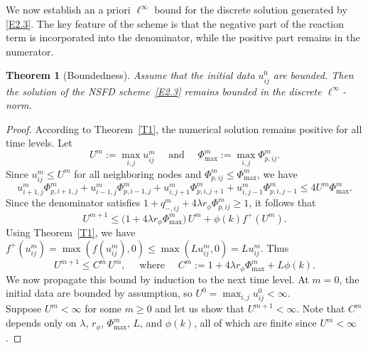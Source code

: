 \documentclass[final,12pt,3p]{elsarticle}
\theoremstyle{plain}
\newtheorem{theorem}{Theorem}
\theoremstyle{definition}
\theoremstyle{remark}
\begin{document}
We now establish an a priori $\ell^\infty$ bound for the discrete solution generated by \eqref{E2.3}. 
The key feature of the scheme is that the negative part of the reaction term is incorporated into the denominator, while the positive part remains in the numerator. 

\begin{theorem}[Boundedness]\label{T3}
Assume that the initial data $u_{ij}^0$ are bounded. 
Then the solution of the NSFD scheme~\eqref{E2.3} remains bounded in the discrete $\ell^\infty$-norm.
\end{theorem}
\begin{proof}
According to Theorem~\ref{T1}, the numerical solution remains positive for all time levels. 
Let
\begin{equation*}
U^m := \max_{i,j} u_{ij}^m \quad \text{ and } \quad \Phi_{\max}^m := \max_{i,j} \Phi_{p,ij}^m.
\end{equation*}
Since $u_{ij}^m \le U^m$ for all neighboring nodes and $\Phi_{p,ij}^m \le \Phi_{\max}^m$, we have
\begin{equation*}
u_{i+1,j}^m \Phi_{p,i+1,j}^m + u_{i-1,j}^m \Phi_{p,i-1,j}^m + u_{i,j+1}^m \Phi_{p,i,j+1}^m + u_{i,j-1}^m \Phi_{p,i,j-1}^m \le 4U^m \Phi_{\max}^m.
\end{equation*}
Since the denominator satisfies $1 + q_{-,ij}^m + 4\lambda r_\phi \Phi_{p,ij}^m \ge 1$,
it follows that
\begin{equation*}
   U^{m+1} \le \bigl(1 + 4\lambda r_\phi \Phi_{\max}^m\bigr)\, U^m + \phi(k) f^+(U^m).
\end{equation*}
Using Theorem~\ref{T1}, we have $f^+(u_{ij}^m) = \max(f(u_{ij}^m), 0) \le \max(L u_{ij}^m, 0) = L u_{ij}^m$. Thus
\begin{equation}\label{E3.1}
U^{m+1} \le C^m \, U^m,  \quad  \text{ where } \quad C^m := 1 + 4\lambda r_\phi \Phi_{\max}^m + L\phi(k).
\end{equation}
We now propagate this bound by induction to the next time level. 
At $m = 0$, the initial data are bounded by assumption, so $U^0 = \max_{i,j} u_{ij}^0 < \infty$.\\
Suppose $U^m < \infty$ for some $m \ge 0$ and let us show that $U^{m+1} < \infty$.
Note that $C^m$ depends only on $\lambda$, $r_\phi$, $\Phi_{\max}^m$, $L$, and $\phi(k)$, all of which are finite since $U^m < \infty$. %

\end{proof}
\end{document}
